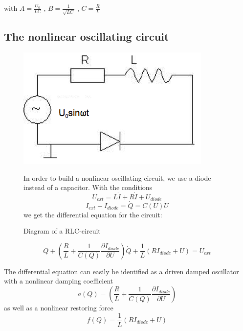with  $A=\frac{U_0}{LC}$ ,  $B=\frac{1}{\sqrt{LC}}$ ,  $C=\frac{R}{L}$

\subsection{The nonlinear oscillating circuit}
\begin{figure}[H]
\begin{minipage}{0.5\textwidth}
\includegraphics[width=\textwidth]{Bilder/nlcirc.png}
\caption{Diagram of a RLC-circuit}
\end{minipage}
\begin{minipage}{0.5\textwidth}
In order to build a nonlinear oscillating circuit, we use a diode instead of a capacitor.  With the conditions
$$U_{ext} = L\dot I + R\dot I + U_{diode}$$
$$I_{ext}-I_{diode} = \dot Q = C(U)\dot U$$
we get the differential equation for the circuit:
\end{minipage}
\end{figure}

\begin{equation} 
\ddot Q + \left(\frac{R}{L} + \frac{1}{C(Q)} \frac{\partial I_{diode}}{\partial U}\right) \dot Q + \frac{1}{L} \left(RI_{diode}+U \right) = U_{ext}
\end{equation}

The differential equation can easily be identified as a driven damped oscillator with a nonlinear damping coefficient
\begin{equation}
 a \left( Q \right) = \left(\frac{R}{L} + \frac{1}{C(Q)} \frac{\partial I_{diode}}{\partial U}\right)
\end{equation}
 as well as a nonlinear restoring force
\begin{equation}
 f \left( Q \right) = \frac{1}{L}(RI_{diode}+U)
\end{equation}

